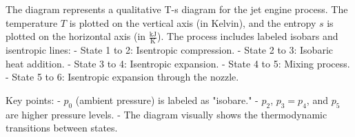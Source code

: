 The diagram represents a qualitative T-s diagram for the jet engine process. The temperature \( T \) is plotted on the vertical axis (in Kelvin), and the entropy \( s \) is plotted on the horizontal axis (in \( \frac{\text{kJ}}{\text{K}} \)). The process includes labeled isobars and isentropic lines:  
- State 1 to 2: Isentropic compression.  
- State 2 to 3: Isobaric heat addition.  
- State 3 to 4: Isentropic expansion.  
- State 4 to 5: Mixing process.  
- State 5 to 6: Isentropic expansion through the nozzle.  

Key points:  
- \( p_0 \) (ambient pressure) is labeled as "isobare."  
- \( p_2 \), \( p_3 = p_4 \), and \( p_5 \) are higher pressure levels.  
- The diagram visually shows the thermodynamic transitions between states.